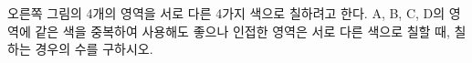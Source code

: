 \noindent\begin{minipage}[t]{0.58\linewidth}\vspace{0pt}\raggedright 오른쪽 그림의 4개의 영역을 서로 다른 4가지 색으로 칠하려고 한다. A, B, C, D의 영역에 같은 색을 중복하여 사용해도 좋으나 인접한 영역은 서로 다른 색으로 칠할 때, 칠하는 경우의 수를 구하시오. \end{minipage}\hfill\begin{minipage}[t]{0.4\linewidth}\vspace{0pt}\centering \resizebox{\ifdim\width>\linewidth\linewidth\else\width\fi}{!}{}\end{minipage}\par
